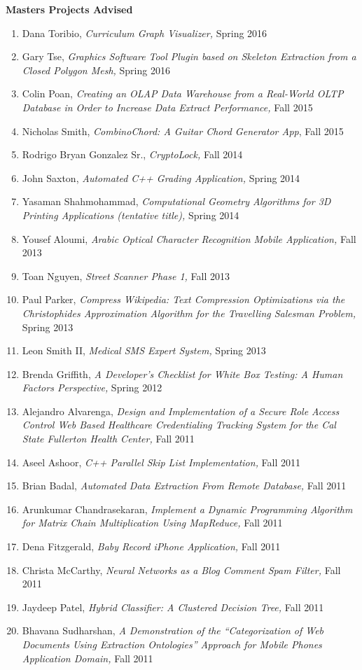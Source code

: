 \documentclass[11pt]{letter}
\begin{document}
\textbf{Masters Projects Advised}
\begin{enumerate}
\item Dana Toribio, \emph{Curriculum Graph Visualizer,} Spring 2016
\item Gary Tse, \emph{Graphics Software Tool Plugin based on Skeleton Extraction from a Closed Polygon Mesh,} Spring 2016
\item Colin Poan, \emph{Creating an OLAP Data Warehouse from a Real-World OLTP Database in Order to Increase Data Extract Performance,} Fall 2015
\item Nicholas Smith, \emph{CombinoChord: A Guitar Chord Generator App}, Fall 2015
\item Rodrigo Bryan Gonzalez Sr., \emph{CryptoLock,} Fall 2014
\item John Saxton, \emph{Automated C++ Grading Application,} Spring 2014
\item Yasaman Shahmohammad, \emph{Computational Geometry Algorithms for 3D Printing Applications (tentative title),} Spring 2014
\item Yousef Aloumi, \emph{Arabic Optical Character Recognition Mobile Application,} Fall 2013
\item Toan Nguyen, \emph{Street Scanner Phase 1,} Fall 2013
\item Paul Parker, \emph{Compress Wikipedia: Text Compression Optimizations via the Christophides Approximation Algorithm for the Travelling Salesman Problem,} Spring 2013
\item Leon Smith II, \emph{Medical SMS Expert System,} Spring 2013
\item Brenda Griffith, \emph{A Developer’s Checklist for White Box Testing: A Human Factors Perspective,} Spring 2012
\item Alejandro Alvarenga, \emph{Design and Implementation of a Secure Role Access Control Web Based Healthcare Credentialing Tracking System for the Cal State Fullerton Health Center,} Fall 2011
\item Aseel Ashoor, \emph{C++ Parallel Skip List Implementation,} Fall 2011
\item Brian Badal, \emph{Automated Data Extraction From Remote Database,} Fall 2011
\item Arunkumar Chandrasekaran, \emph{Implement a Dynamic Programming Algorithm for Matrix Chain Multiplication Using MapReduce,} Fall 2011
\item Dena Fitzgerald, \emph{Baby Record iPhone Application,} Fall 2011
\item Christa McCarthy, \emph{Neural Networks as a Blog Comment Spam Filter,} Fall 2011
\item Jaydeep Patel, \emph{Hybrid Classifier: A Clustered Decision Tree,} Fall 2011
\item Bhavana Sudharshan, \emph{A Demonstration of the ``Categorization of Web Documents Using Extraction Ontologies'' Approach for Mobile Phones Application Domain,} Fall 2011
\end{enumerate}
\end{document}
